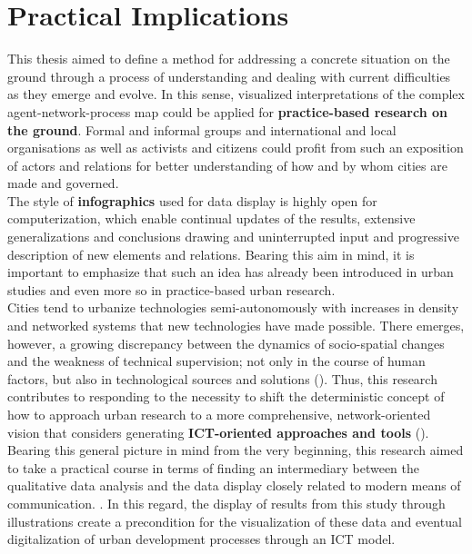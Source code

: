 \documentclass[11pt]{report}
\begin{document}
{{{\section{Practical Implications}

This thesis aimed to define a method for addressing a concrete situation on the ground through a process of understanding and dealing with current difficulties as they emerge and evolve.
In this sense, visualized interpretations of the complex agent-network-process map could be applied for \textbf{practice-based research on the ground}.
Formal and informal groups and international and local organisations as well as activists and citizens could profit from such an exposition of actors and relations for better understanding of how and by whom cities are made and governed.
\\

The style of \textbf{infographics} used for data display is highly open for computerization, which enable continual updates of the results, extensive generalizations and conclusions drawing and uninterrupted input and progressive description of new elements and relations.
Bearing this aim in mind, it is important to emphasize that such an idea has already been introduced in urban studies and even more so in practice-based urban research.
\\

Cities tend to urbanize technologies semi-autonomously with increases in density and networked systems that new technologies have made possible.
There emerges, however, a growing discrepancy between the dynamics of socio-spatial changes and the weakness of technical supervision; not only in the course of human factors, but also in technological sources and solutions (\href{Vauquelin}{\citealt{vauquelin_planification_2010}}).
Thus, this research contributes to responding to the necessity to shift the deterministic concept of how to approach urban research to a more comprehensive, network-oriented vision that considers generating \textbf{ICT-oriented approaches and tools} (\href{Huang}{\citealt{huang_ict-oriented_2012}}).
\\

Bearing this general picture in mind from the very beginning, this research aimed to take a practical course in terms of finding an intermediary between the qualitative data analysis and the data display closely related to modern means of communication.
. In this regard, the display of results from this study through illustrations create a precondition for the visualization of these data and eventual digitalization of urban development processes through an ICT model.

}}}
\end{document}
